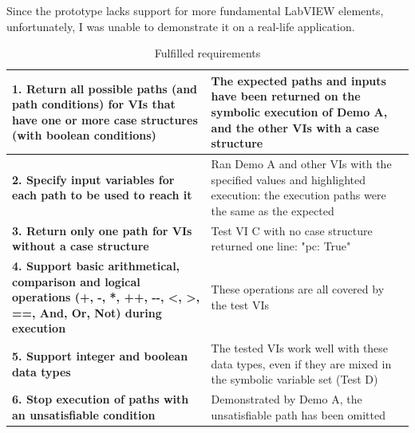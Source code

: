 Since the prototype lacks support for more fundamental LabVIEW elements, unfortunately, I was unable to demonstrate it on a real-life application.

\begin{table}[ht]
\centering
\begin{tabularx}{\linewidth}{XX}
\toprule
\textbf{1. Return all possible paths (and path conditions) for VIs that have one or more case structures (with boolean conditions)}                         & The expected paths and inputs have been returned on the symbolic execution of Demo A, and the other VIs with a case structure                                           \\ \midrule
\textbf{2. Specify input variables for each path to be used to reach it}                                                                                    & Ran Demo A and other VIs with the specified values and highlighted execution: the execution paths were the same as the expected                                         \\ \midrule
\textbf{3. Return only one path for VIs without a case structure}                                                                                           & Test VI C with no case structure returned one line: "pc: True"                                                                                           \\ \midrule
\textbf{4. Support basic arithmetical, comparison and logical operations (+, -, *, ++, -{}-, \textless{}, \textgreater{}, ==, And, Or, Not) during execution} & These operations are all covered by the test VIs \\ \midrule
\textbf{5. Support integer and boolean data types}                                                                                                          & The tested VIs work well with these data types, even if they are mixed in the symbolic variable set (Test D)                                                            \\ \midrule
\textbf{6. Stop execution of paths with an unsatisfiable condition}                                                                                         & Demonstrated by Demo A, the unsatisfiable path has been omitted                                                                                                         \\ \bottomrule
\end{tabularx}

\caption{Fulfilled requirements}
  \label{Tab:Requ}
\end{table}


